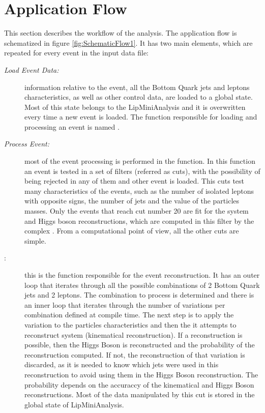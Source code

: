 \section{Application Flow}
\label{Application:Flow}

This section describes the workflow of the \tth analysis. The application flow is schematized in figure \ref{fig:SchematicFlow1}. It has two main elements, which are repeated for every event in the input data file: 

\begin{description}
	\item[\textit{Load Event Data:}] information relative to the event, all the Bottom Quark jets and leptons characteristics, as well as other control data, are loaded to a global state. Most of this state belongs to the LipMiniAnalysis and it is overwritten every time a new event is loaded. The function responsible for loading and processing an event is named \ttLoop.
	\item[\textit{Process Event:}] most of the event processing is performed in the \ttDoCuts function. In this function an event is tested in a set of filters (referred as cuts), with the possibility of being rejected in any of them and other event is loaded. This cuts test many characteristics of the events, such as the number of isolated leptons with opposite signs, the number of jets and the value of the particles masses. Only the events that reach cut number 20 are fit for the \ttbar system and Higgs boson reconstructions, which are computed in this filter by the complex \ttDilepKinFit. From a computational point of view, all the other cuts are simple.
	\item[\ttDilepKinFit:] this is the function responsible for the event reconstruction. It has an outer loop that iterates through all the possible combinations of 2 Bottom Quark jets and 2 leptons. The combination to process is determined and there is an inner loop that iterates through the number of variations per combination defined at compile time. The next step is to apply the variation to the particles characteristics and then the it attempts to reconstruct \ttbar system (kinematical reconstruction). If a reconstruction is possible, then the Higgs Boson is reconstructed and the probability of the reconstruction computed. If not, the reconstruction of that variation is discarded, as it is needed to know which jets were used in this reconstruction to avoid using them in the Higgs Boson reconstruction. The probability depends on the accuraccy of the kinematical and Higgs Boson reconstructions. Most of the data manipulated by this cut is stored in the global state of LipMiniAnalysis.
\end{description}

